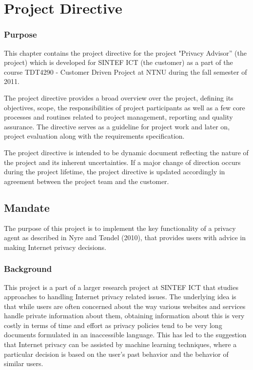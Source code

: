  

\chapter{Project Directive}
\label{directive}
\minitoc

\subsection*{Purpose}
This chapter contains the project directive for the project "Privacy Advisor'' (the project) which is developed for SINTEF ICT (the customer) as a part of the course TDT4290 - Customer Driven Project at NTNU during the fall semester of 2011.

The project directive provides a broad overview over the project, defining its objectives, scope, the responsibilities of project participants as well as a few core processes and routines related to project management, reporting and quality assurance. The directive serves as a guideline for project work and later on, project evaluation along with the requirements specification.

The project directive is intended to be dynamic document reflecting the nature of the project and its inherent uncertainties. If a major change of direction occurs during the project lifetime, the project directive is updated accordingly in agreement between the project team and the customer.

\section{Mandate}
The purpose of this project is to implement the key functionality of a privacy agent as described in Nyre and T{\o}ndel (2010), that provides users with advice in making Internet privacy decisions. 

\subsection{Background}
This project is a part of a larger research project at SINTEF ICT that studies approaches to handling Internet privacy related issues. The underlying idea is that while users are often concerned about the way various websites and services handle private information about them, obtaining information about this is very costly in terms of time and effort as privacy policies tend to be very long documents formulated in an inaccessible language. This has led to the suggestion that Internet privacy can be assisted by machine learning techniques, where a particular decision is based on the user's past behavior and the behavior of similar users.

